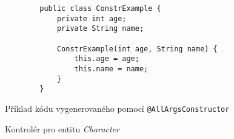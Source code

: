 \documentclass[czech,bachelor]{../../shared/diploma}
\begin{document}
\MakeTitlePages

\listoffigures
\clearpage











\begin{listing}[H]
    \begin{verbatim}
        public class ConstrExample {
            private int age;
            private String name;

            ConstrExample(int age, String name) {
                this.age = age;
                this.name = name;
            }
        }
    \end{verbatim}
    \caption{Příklad kódu vygenerovaného pomocí \texttt{@AllArgsConstructor}}
    \label{code:lombok:constructor}
\end{listing}
\begin{listing}[H]
    \caption{Kontrolér pro entitu \textit{Character}}
    \label{code:characterController}
\end{listing}



\printbibliography[title={Literatura}, heading=bibintoc]
\end{document}
